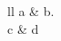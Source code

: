 \documentclass{article}
\begin{document}
\begin{tblr}{ll}
a & b\the\rownum.\therownum \\
c & d\number\rownum \\
\end{tblr}
\end{document}
